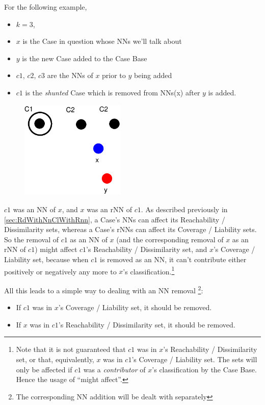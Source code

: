 \documentclass[a4paper,11pt]{report}
\begin{document}
For the following example,
\begin{itemize}
	\item $k=3$, 
	\item $x$ is the Case in question whose NNs  we'll talk about
	\item $y$ is the new Case added to the Case Base
	\item $c1$, $c2$, $c3$ are the NNs of $x$ prior to $y$ being added
	\item $c1$ is the \emph{shunted} Case which is removed from NNs(x) after $y$ is added.
\end{itemize}

\begin{figure}[h!] \centering
\includegraphics[width=5cm]{./Drawn/NnMightAffectEg}
\end{figure}

$c1$ was an NN of $x$, and $x$ was an rNN of $c1$. As described previously in \ref{sec:RdWithNnClWithRnn}, a Case's NNs can affect its Reachability / Dissimilarity sets, whereas a Case's rNNs can affect its Coverage / Liability sets. So the removal of $c1$ as an NN of $x$ (and the corresponding removal of $x$ as an rNN of $c1$) might affect $c1$'s Reachability / Dissimilarity set, and $x$'s Coverage / Liability set, because when $c1$ is removed as an NN, it can't contribute either positively or negatively any more to $x$'s classification.\footnote{Note that it is not guaranteed that $c1$ was in $x$'s Reachability / Dissimilarity set, or that, equivalently, $x$ was in $c1$'s Coverage / Liability set. The sets will only be affected if $c1$ was a \emph{contributor} of $x$'s classification by the Case Base. Hence the usage of ``might affect''.}

All this leads to a simple way to dealing with an NN removal \footnote{The corresponding NN addition will be dealt with separately}:
\begin{itemize}
	\item If $c1$ was in $x$'s Coverage / Liability set, it should be removed.
	\item If $x$ was in $c1$'s Reachability / Dissimilarity set, it should be removed.
\end{itemize}
\end{document}
